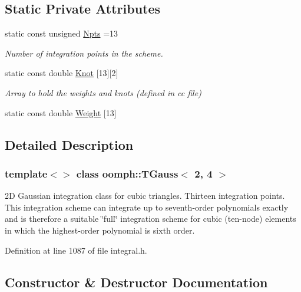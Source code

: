 \subsection*{Static Private Attributes}
\begin{DoxyCompactItemize}
\item 
static const unsigned \hyperlink{classoomph_1_1TGauss_3_012_00_014_01_4_aab349ebbfc0ea19da48b832686a2f5c8}{Npts} =13
\begin{DoxyCompactList}\small\item\em Number of integration points in the scheme. \end{DoxyCompactList}\item 
static const double \hyperlink{classoomph_1_1TGauss_3_012_00_014_01_4_a40487ef4ddee551e38fdce16dcd537ea}{Knot} \mbox{[}13\mbox{]}\mbox{[}2\mbox{]}
\begin{DoxyCompactList}\small\item\em Array to hold the weights and knots (defined in cc file) \end{DoxyCompactList}\item 
static const double \hyperlink{classoomph_1_1TGauss_3_012_00_014_01_4_ad68f6698c9fd4fc05e6878cba10c57b3}{Weight} \mbox{[}13\mbox{]}
\end{DoxyCompactItemize}


\subsection{Detailed Description}
\subsubsection*{template$<$$>$\newline
class oomph\+::\+T\+Gauss$<$ 2, 4 $>$}

2D Gaussian integration class for cubic triangles. Thirteen integration points. This integration scheme can integrate up to seventh-\/order polynomials exactly and is therefore a suitable \char`\"{}full\char`\"{} integration scheme for cubic (ten-\/node) elements in which the highest-\/order polynomial is sixth order. 

Definition at line 1087 of file integral.\+h.



\subsection{Constructor \& Destructor Documentation}
\mbox{\label{classoomph_1_1TGauss_3_012_00_014_01_4_a1c91bef13f1f5949a4bbc6d6991071eb}} 

